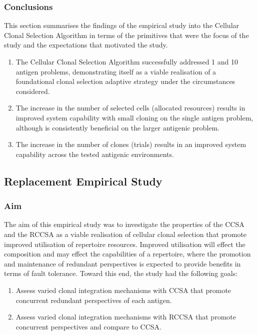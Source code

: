 %
%
\subsubsection{Conclusions}
This section summarises the findings of the empirical study into the Cellular Clonal Selection Algorithm in terms of the primitives that were the focus of the study and the expectations that motivated the study.

\begin{enumerate}
		\item The Cellular Clonal Selection Algorithm successfully addressed 1 and 10 antigen problems, demonstrating itself as a viable realisation of a foundational clonal selection adaptive strategy under the circumstances considered.
		\item The increase in the number of selected cells (allocated resources) results in improved system capability with small cloning on the single antigen problem, although is consistently beneficial on the larger antigenic problem.
		\item The increase in the number of clones (trials) results in an improved system capability across the tested antigenic environments.	
\end{enumerate}


%
%
\subsection{Replacement Empirical Study}
\label{sec:cells:ccsa:rcsa}

%
%
\subsubsection{Aim}
The aim of this empirical study was to investigate the properties of the CCSA and the RCCSA as a viable realisation of cellular clonal selection that promote improved utilisation of repertoire resources. Improved utilisation will effect the composition and may effect the capabilities of a repertoire, where the promotion and maintenance of redundant perspectives is expected to provide benefits in terms of fault tolerance. Toward this end, the study had the following goals:

\begin{enumerate}
	\item Assess varied clonal integration mechanisms with CCSA that promote concurrent redundant perspectives of each antigen.
	\item Assess varied clonal integration mechanisms with RCCSA that promote concurrent perspectives and compare to CCSA.
\end{enumerate}

